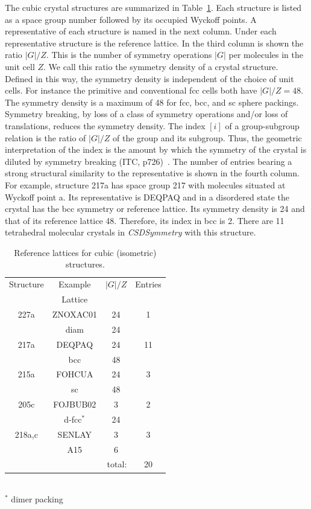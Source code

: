 \documentclass[preprint]{iucr}              %
\begin{document}
The cubic crystal structures are summarized in Table~\ref{cubic}.
Each structure is listed as a space group number followed by its
occupied Wyckoff points. A representative of each structure is named
in the next column.  Under each representative structure is  the
reference lattice. In the third column is shown the ratio $|G|/Z$.
This is the number of symmetry operations $|G|$ per molecules in the
unit cell $Z$. We call this ratio the symmetry density of a crystal
structure. Defined in this way, the symmetry density is independent
of the choice of unit cells. For instance the primitive and
conventional fcc cells both have $|G|/Z=48$. The symmetry density is
a maximum of 48 for fcc, bcc, and sc sphere packings. Symmetry
breaking, by loss of a class of symmetry operations and/or loss of
translations, reduces the symmetry density. The index $[i]$ of a
group-subgroup relation is the ratio of $|G|/Z$ of the group and its
subgroup. Thus, the geometric interpretation of the index is the
amount by which the symmetry of the crystal is diluted by symmetry
breaking (ITC, p726)~\cite{Hahn83}. The number of entries bearing a
strong structural similarity to the representative is shown in the
fourth column. For example, structure 217a has space group 217 with
molecules situated at Wyckoff point a. Its representative is DEQPAQ
and in a disordered state the crystal has the bcc symmetry or
reference lattice. Its symmetry density is 24 and that of its
reference lattice 48. Therefore, its index in bcc is 2. There are 11
tetrahedral molecular crystals in \emph{CSDSymmetry} with this
structure.

\begin{table}
\caption{Reference lattices for cubic (isometric) structures.}
\label{cubic}
\begin{center}
\begin{tabular}{cccc}%
\cline{1-4}
Structure & Example & $|G|/Z$ & Entries \\
        & Lattice \\
\cline{1-4}
227a    & ZNOXAC01 & 24 & 1 \\
        & diam     & 24 \\
217a    & DEQPAQ   & 24 & 11 \\
        & bcc      & 48 \\
215a    & FOHCUA   & 24 & 3 \\
        & sc       & 48 \\
205c    & FOJBUB02 &  3 & 2 \\
        & d-fcc$^*$& 24 \\
218a,c  & SENLAY   &  3 & 3 \\
        & A15      &  6 \\
\cline{4-4}
\multicolumn{3}{r}{total:} & 20 \\
\cline{1-4}
\end{tabular} \\
$^*$ dimer packing
\end{center}
\end{table}
\end{document}
